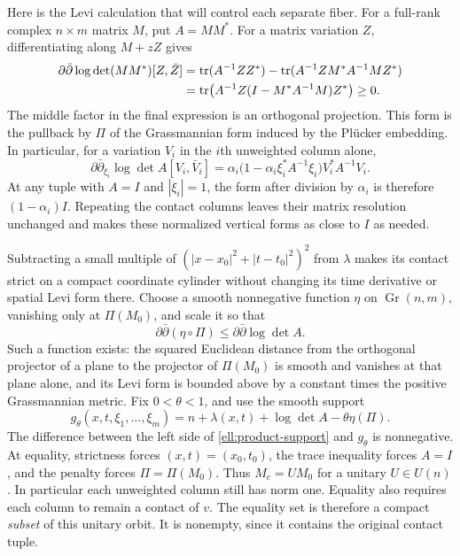 \documentclass[11pt]{article}
\theoremstyle{definition}
\theoremstyle{remark}
\newcommand{\dd}{\partial\bar\partial}
\DeclareMathOperator{\tr}{tr}
\DeclareMathOperator{\Gr}{Gr}
\numberwithin{equation}{section}
\begin{document}
Here is the Levi calculation that will control each separate fiber.
For a full-rank complex $n\times m$ matrix $M$, put $A=MM^*$.
For a matrix variation $Z$, differentiating along $M+zZ$ gives
\begin{align}
 \dd\log\det(MM^*)[Z,\bar Z]
 &=\tr(A^{-1}ZZ^*)
   -\tr(A^{-1}ZM^*A^{-1}MZ^*) \notag\\
 &=\tr\bigl(A^{-1}Z(I-M^*A^{-1}M)Z^*\bigr)\ge0.
 \label{ell:rectangular-levi}
\end{align}
The middle factor in the final expression is an orthogonal projection.
This form is the pullback by $\Pi$ of the Grassmannian form induced
by the Pl\"ucker embedding.  In particular, for a variation $V_i$ in
the $i$th unweighted column alone,
\begin{equation}\label{ell:single-column}
 \dd_{\xi_i}\log\det A[V_i,\bar V_i]
 =\alpha_i\bigl(1-\alpha_i\xi_i^*A^{-1}\xi_i\bigr)
      V_i^*A^{-1}V_i.
\end{equation}
At any tuple with $A=I$ and $|\xi_i|=1$, the form after division by
$\alpha_i$ is therefore $(1-\alpha_i)I$.  Repeating the contact
columns leaves their matrix resolution unchanged and makes these
normalized vertical forms as close to $I$ as needed.

Subtracting a small multiple of
$(|x-x_0|^2+|t-t_0|^2)^2$ from $\lambda$ makes its contact strict on a compact
coordinate cylinder without changing its time derivative or spatial
Levi form there.  Choose a smooth nonnegative function $\eta$ on
$\Gr(n,m)$, vanishing only at $\Pi(M_0)$, and scale it so that
\begin{equation}\label{ell:grassmann-penalty}
 \dd(\eta\circ\Pi)\le\dd\log\det A.
\end{equation}
Such a function exists: the squared Euclidean distance from the
orthogonal projector of a plane to the projector of $\Pi(M_0)$ is
smooth and vanishes at that plane alone, and its Levi form is bounded
above by a constant times the positive Grassmannian metric.
Fix $0<\theta<1$, and use the smooth support
\begin{equation}\label{ell:localized-support}
 g_\theta(x,t,\xi_1,\ldots,\xi_m)
 =n+\lambda(x,t)+\log\det A-\theta\eta(\Pi).
\end{equation}
The difference between the left side of \eqref{ell:product-support}
and $g_\theta$ is nonnegative.  At equality, strictness forces
$(x,t)=(x_0,t_0)$, the trace inequality forces $A=I$, and the penalty
forces $\Pi=\Pi(M_0)$.  Thus $M_c=UM_0$ for a unitary $U\in U(n)$.
In particular each unweighted column still has norm one.  Equality
also requires each column to remain a contact of $v$.
The equality set is therefore a compact \emph{subset} of this unitary
orbit.  It is nonempty, since it contains the original contact tuple.
\end{document}
